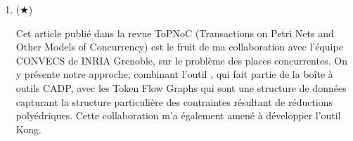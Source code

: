 \begin{enumerate}
  \smallbreak
	\item ($\bigstar$) \cite{amat_toolchain_2023} 
  \begin{mdframed}
    Cet article publié dans la revue ToPNoC (Transactions on Petri Nets and Other
  Models of Concurrency) est le fruit de ma collaboration avec l’équipe CONVECS de
  INRIA Grenoble, sur le problème des places concurrentes. On y présente notre
  approche, combinant l'outil \caesar, qui fait partie de la boîte à outils
  \textsf{CADP}, avec les Token
  Flow Graphs qui sont une structure de données capturant la structure
  particulière des contraintes résultant de réductions polyédriques. Cette
  collaboration m’a également amené à développer l’outil
  \textsf{Kong}.
  \end{mdframed}
\end{enumerate}


\vspace{10pt}
